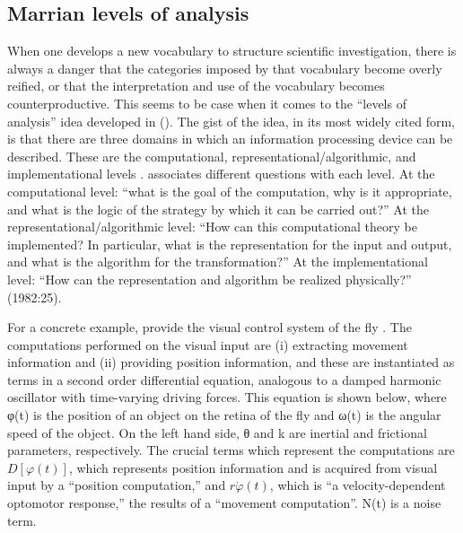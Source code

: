 \subsection{Marrian levels of analysis}

When one develops a new vocabulary to structure scientific investigation, there is always a danger that the categories imposed by that vocabulary become overly reified, or that the interpretation and use of the vocabulary becomes counterproductive. This seems to be case when it comes to the “levels of analysis” idea developed in (\citealt{Marr1982,MarrPoggio1977}). The gist of the idea, in its most widely cited form, is that there are three domains in which an information processing device can be described. These are the computational, representational/algorithmic, and implementational levels \citep{Marr1982}. \citet{Marr1982} associates different questions with each level. At the computational level: “what is the goal of the computation, why is it appropriate, and what is the logic of the strategy by which it can be carried out?” At the representational/algorithmic level: “How can this computational theory be implemented? In particular, what is the representation for the input and output, and what is the algorithm for the transformation?” At the implementational level: “How  can the representation and algorithm be realized physically?” (1982:25).

  For a concrete example, \citet{MarrPoggio1977} provide the visual control system of the fly \citep{ReichardtPoggio1976}. The computations performed on the visual input are (i) extracting movement information and (ii) providing position information, and these are instantiated as terms in a second order differential equation, analogous to a damped harmonic oscillator with time-varying driving forces. This equation is shown below, where  φ(t) is the position of an object on the retina of the fly and ω(t) is the angular speed of the object. On the left hand side, θ and k are inertial and frictional parameters, respectively. The crucial terms which represent the computations are  $D\left[\varphi \left(t\right)\right]$, which represents position information and is acquired from visual input by a “position computation,” and  $r\acute{{\varphi} }\left(t\right)$, which is “a velocity-dependent optomotor response,” the results of a “movement computation”. N(t) is a noise term.


